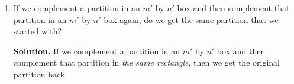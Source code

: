 \documentclass{book}
\begin{document}
\begin{activity}[]
\begin{enumerate}[font=\bfseries,label=(\alph*),ref=\alph*]
\item\label{task-271} \hypertarget{p-1570}{}%
If we complement a partition in an \(m'\) by \(n'\) box and then complement that partition in an \(m'\) by \(n'\) box again, do we get the same partition that we started with?%
\par\smallskip%
\noindent\textbf{Solution.}\hypertarget{solution-221}{}\quad%
\hypertarget{p-1571}{}%
If we complement a partition in an \(m'\) by \(n'\) box and then complement that partition in \emph{the same rectangle}, then we get the original partition back.%
\end{enumerate}
\end{activity}
\end{document}

